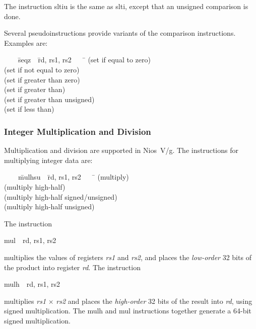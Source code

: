 \documentclass[11pt, twoside, pdftex]{article}
\newenvironment{ctabbing}%
{\begin{center}\begin{minipage}{\textwidth}\begin{tabbing}}
{\end{tabbing}\end{minipage}\end{center}}
\begin{document}
The instruction {\sf sltiu} is the same as {\sf slti}, except that an unsigned comparison
is done.

Several pseudoinstructions provide variants of the comparison instructions. Examples are:
\vspace{-\baselineskip}
\begin{ctabbing}
~~~~\={\sf seqz}~~\={\sf rd, rs1, rs2}~~~~\=\kill
{}  \>(set if equal to zero)\\
  \>(set if not equal to zero)\\
  \>(set if greater than zero)\\
  \>(set if greater than)\\
  \>(set if greater than unsigned)\\
  \>(set if less than)
\end{ctabbing}

\subsubsection{Integer Multiplication and Division}

Multiplication and division are supported in Nios~V/g. The instructions for multiplying 
integer data are:
\vspace{-\baselineskip}
\begin{ctabbing}
~~~~\={\sf mulhsu}~~\={\sf rd, rs1, rs2}~~~~\=\kill
{} \>(multiply)\\
 \>(multiply high-half)\\
 \>(multiply high-half signed/unsigned)\\
 \>(multiply high-half unsigned)
\end{ctabbing}

\noindent
The instruction
\vspace{-\baselineskip}
\begin{center}
{\sf mul~~rd, rs1, rs2}
\end{center}
\noindent
multiplies the values of registers {\it rs1} and {\it rs2}, and places the {\it low-order}
32 bits of the product into register {\it rd}.  The instruction
\vspace{-\baselineskip}
\begin{center}
{\sf mulh~~rd, rs1, rs2}
\end{center}
\noindent
multiplies {\it rs1} $\times$ {\it rs2} and places the {\it high-order} 32 bits of the result 
into {\it rd}, using signed multiplication. The {\sf mulh} and {\sf mul} instructions
together generate a 64-bit signed multiplication.
 
\end{document}
